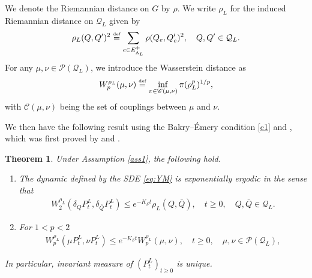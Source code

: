 \documentclass[11pt,UTF-8,reqno]{amsart}
\numberwithin{equation}{section}
\newtheorem{theorem}{Theorem}[section]
\newcommand{\eqdef}{\stackrel{\mbox{\tiny def}}{=}}
\def\cQ{{\mathcal Q}}
\def\cS{{\mathcal S}}
\def\sC{{\mathscr C}}
\def\sP{{\mathscr P}}
\def\geq{\geqslant}
\def\leq{\leqslant}
\def\bt{\begin{theorem}}
\def\et{\end{theorem}}
\def\geq{\geqslant}
\def\leq{\leqslant}
\begin{document}




We denote the Riemannian distance on $G$  by $\rho$.
We write $\rho_L$ for the induced Riemannian distance  on $\cQ_L$ given by
\begin{align*}
	\rho_L(Q,Q')^2\eqdef \sum_{e\in E_{\Lambda_{L}}^+}\rho(Q_e,Q'_e)^2, \quad Q,Q'\in \cQ_L.
\end{align*}
For any $\mu, \nu\in \sP(\cQ_L)$, we introduce the Wasserstein distance as
\begin{align*}
	W_p^{\rho_L}(\mu,\nu)\eqdef \inf_{\pi\in \sC(\mu,\nu)}\pi(\rho_L^p)^{1/p},
\end{align*}
with $\sC(\mu,\nu)$ being the set of couplings between $\mu$ and $\nu$.


We then have the following result using the Bakry--\'Emery condition \eqref{c1} and \cite[Theorem 5.6.1]{Wang}, which was first proved by
\cite{Bakry97} and
\cite{RS05}.

\bt\label{th:4.2} %
Under Assumption \ref{ass1}, the following hold.
\begin{enumerate}
\item The dynamic defined by the SDE \eqref{eq:YM} is exponentially ergodic in the sense that
\begin{align}\label{eq:er}
	W_2^{\rho_L}(\delta_QP_t^L,\delta_{\bar Q}P_t^L)\leq e^{-K_\cS t}\rho_L(Q,\bar{Q}), \quad t\geq 0, \quad  Q,\bar Q\in \cQ_L.
\end{align}
\item  For $1<p<2$
\begin{align}\label{eq:er1}
	W_p^{\rho_L}(\mu P_t^L,\nu P_t^L)\leq e^{-K_\cS t}W_p^{\rho_L}(\mu ,\nu ), \quad t\geq 0, \quad\mu,\nu\in \sP(\cQ_L),
\end{align}
\end{enumerate}
In particular,  invariant measure of $(P_t^L)_{t\geq0}$ is unique.
 \et



\end{document}
